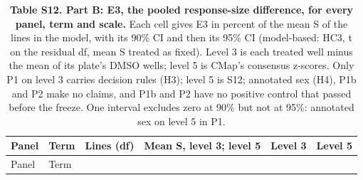 \documentclass[
  11pt,
  letterpaper,
]{article}
\begin{document}
\begin{longtable}[]{@{}
  >{\raggedright\arraybackslash}p{}
  >{\raggedright\arraybackslash}p{}
  >{\raggedright\arraybackslash}p{}
  >{\raggedright\arraybackslash}p{}
  >{\raggedright\arraybackslash}p{}
  >{\raggedright\arraybackslash}p{}@{}}
\caption{\textbf{Table S12. Part B: E3, the pooled response-size
difference, for every panel, term and scale.} Each cell gives E3 in
percent of the mean S of the lines in the model, with its 90\% CI and
then its 95\% CI (model-based: HC3, t on the residual df, mean S treated
as fixed). Level 3 is each treated well minus the mean of its plate's
DMSO wells; level 5 is CMap's consensus z-scores. Only P1 on level 3
carries decision rules (H3); level 5 is S12; annotated sex (H4), P1b and
P2 make no claims, and P1b and P2 have no positive control that passed
before the freeze. One interval excludes zero at 90\% but not at 95\%:
annotated sex on level 5 in P1.}\tabularnewline
\toprule\noalign{}
\begin{minipage}[b]{\linewidth}\raggedright
Panel
\end{minipage} & \begin{minipage}[b]{\linewidth}\raggedright
Term
\end{minipage} & \begin{minipage}[b]{\linewidth}\raggedright
Lines (df)
\end{minipage} & \begin{minipage}[b]{\linewidth}\raggedright
Mean S, level 3; level 5
\end{minipage} & \begin{minipage}[b]{\linewidth}\raggedright
Level 3
\end{minipage} & \begin{minipage}[b]{\linewidth}\raggedright
Level 5
\end{minipage} \\
\midrule\noalign{}
\endfirsthead
\toprule\noalign{}
\begin{minipage}[b]{\linewidth}\raggedright
Panel
\end{minipage} & \begin{minipage}[b]{\linewidth}\raggedright
Term
\end{minipage} & \begin{minipage}[b]{\linewidth}\raggedright

\end{minipage}
\end{longtable}
\end{document}
